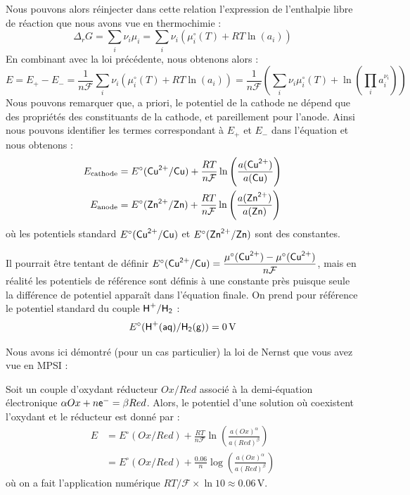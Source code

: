 \documentclass[11pt,fleqn]{book} %
\begin{document}
Nous pouvons alors réinjecter dans cette relation l'expression de l'enthalpie libre de réaction que nous avons vue en thermochimie :
\begin{equation}
	\Delta_r G = \sum_i \nu_i \mu_i = \sum_i \nu_i \left( \mu_i^\circ(T) + R T \ln(a_i) \right)
\end{equation}
En combinant avec la loi précédente, nous obtenons alors :
\begin{equation}
	E = E_{+} - E_{-} = \frac{1}{n \mathcal{F}} \sum_i \nu_i \left( \mu_i^\circ(T) + R T \ln(a_i) \right) = \frac{1}{n \mathcal{F}} \left( \sum_i \nu_i \mu_i^\circ(T) + \ln \left( \prod_i a_i^{\nu_i} \right) \right)
\end{equation}
Nous pouvons remarquer que, a priori, le potentiel de la cathode ne dépend que des propriétés des constituants de la cathode, et pareillement pour l'anode. Ainsi nous pouvons identifier les termes correspondant à $E_{+}$ et $E_{-}$ dans l'équation et nous obtenons :
\begin{align}
	E_{\rm cathode} &= E^\circ(\ce{Cu^{2+}/Cu}) + \frac{R T}{n \mathcal{F}} \ln \left( \frac{a(\ce{Cu^{2+}})}{a(\ce{Cu})}  \right)\\
	E_{\rm anode} &= E^\circ(\ce{Zn^{2+}/Zn}) + \frac{R T}{n \mathcal{F}} \ln \left( \frac{a(\ce{Zn^{2+}})}{a(\ce{Zn})}  \right)
\end{align}
où les potentiels standard $E^\circ(\ce{Cu^{2+}/Cu})$ et $E^\circ(\ce{Zn^{2+}/Zn})$ sont des constantes.
\begin{remark}
	Il pourrait être tentant de définir $E^\circ(\ce{Cu^{2+}/Cu}) = \dfrac{\mu^\circ(\ce{Cu^{2+}})-\mu^\circ(\ce{Cu^{2+}})}{n \mathcal{F}}$, mais en réalité les potentiels de référence sont définis à une constante près puisque seule la différence de potentiel apparaît dans l'équation finale. On prend pour référence le potentiel standard du couple $\ce{H+/H2}$ :
	\begin{equation}
		E^\circ(\ce{H+(aq)/H2(g)}) = 0\,\mathrm{V}
	\end{equation}
\end{remark}

Nous avons ici démontré (pour un cas particulier) la loi de Nernst que vous avez vue en MPSI :
\begin{theorem}
	Soit un couple d'oxydant réducteur $Ox/Red$ associé à la demi-équation électronique $\alpha Ox + n \ce{e}^- = \beta Red$. Alors, le potentiel d'une solution où coexistent l'oxydant et le réducteur est donné par :
	\begin{align}
		E &= E^\circ(Ox/Red) + \frac{R T}{n \mathcal{F}} \ln \left( \frac{a(Ox)^\alpha}{a(Red)^\beta} \right) \\
		&= E^\circ(Ox/Red) + \frac{0.06}{n} \log \left( \frac{a(Ox)^\alpha}{a(Red)^\beta} \right)
	\end{align}
	où on a fait l'application numérique $R T/\mathcal{F} \times  \ln 10 \approx 0.06$\,V.
\end{theorem}
\end{document}
